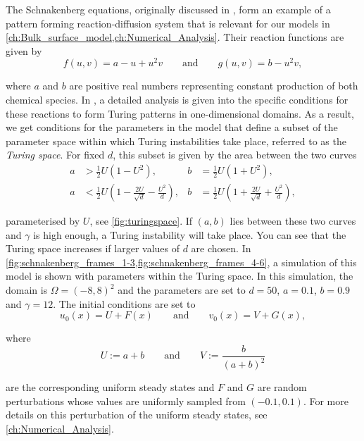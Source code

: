 The Schnakenberg equations, originally discussed in \cite{schnakenberg79}, form an example of a pattern forming reaction-diffusion system that is relevant for our models in \cref{ch:Bulk_surface_model,ch:Numerical_Analysis}. Their reaction functions are given by
%
\begin{equation}
    \label{eq:schnakenberg_reactions}
    f(u, v) = a - u + u^2 v \qquad \text{and} \qquad g(u,v) = b - u^2 v,
\end{equation}

\noindent
where $a$ and $b$ are positive real numbers representing constant production of both chemical species. In \cite{murray03}, a detailed analysis is given into the specific conditions for these reactions to form Turing patterns in one-dimensional domains. As a result, we get conditions for the parameters in the model that define a subset of the parameter space within which Turing instabilities take place, referred to as the \emph{Turing space}. For fixed $d$, this subset is given by the area between the two curves
%
\begin{align*}
    a &> \frac{1}{2} U \left(1 - U^2\right), & b &= \frac{1}{2} U \left(1 + U^2\right), \\
    a &< \frac{1}{2} U \left(1 - \frac{2U}{\sqrt{d}} - \frac{U^2}{d}\right), & b &= \frac{1}{2} U \left(1 + \frac{2U}{\sqrt{d}} + \frac{U^2}{d}\right),
\end{align*}

\noindent
parameterised by $U$, see \cref{fig:turingspace}. If $(a, b)$ lies between these two curves and $\gamma$ is high enough, a Turing instability will take place. You can see that the Turing space increases if larger values of $d$ are chosen. In \cref{fig:schnakenberg_frames_1-3,fig:schnakenberg_frames_4-6}, a simulation of this model is shown with parameters within the Turing space. In this simulation, the domain is $\Omega = (-8, 8)^2$ and the parameters are set to $d = 50$, $a = 0.1$, $b = 0.9$ and $\gamma = 12$. The initial conditions are set to
%
\begin{equation}\label{eq:schnakenberg_initial}
    u_0(x) = U + F(x) \qquad \text{and} \qquad v_0(x) = V + G(x),
\end{equation}

\noindent
where
%
\begin{equation}
    \label{eq:schnakenberg_steadystates}
    U := a + b \qquad \text{and} \qquad V := \frac{b}{(a + b)^2}
\end{equation}

\noindent
are the corresponding uniform steady states and $F$ and $G$ are random perturbations whose values are uniformly sampled from $(-0.1, 0.1)$. For more details on this perturbation of the uniform steady states, see \cref{ch:Numerical_Analysis}.


